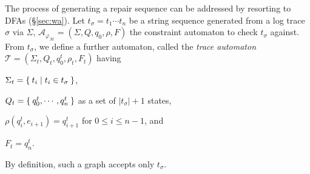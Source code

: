 %

The process of generating a repair sequence can be addressed by resorting to DFAs (\S\ref{sec:wa}). Let $t_\sigma=t_1\cdots t_n$ be a string sequence generated from a log trace $\sigma$ via $\Sigma$, $\mathcal{A}_{\varphi_{\mathcal{M}}}=(\Sigma,Q,q_0,\rho,F)$ the constraint automaton to check $t_\sigma$ against. From $t_\sigma$, we define a further automaton, called the \textit{trace automaton} $\mathcal{T}=(\Sigma_t,Q_t,q_0^t,\rho_t,F_t)$ having \begin{enumerate*}[label=\emph{\alph*})]
	\item $\Sigma_t=\Set{t_i|t_i\in t_\sigma}$,
	\item $Q_t=\Set{q_0^t,\cdots,q_n^t}$ as a set of $|t_\sigma|+1$ states,
	\item $\rho(q_i^t,e_{i+1})=q_{i+1}^t$ for $0\leq i\leq n-1$,
	and
	\item $F_t={q_n^t}$.
\end{enumerate*} By definition, such a graph accepts only $t_\sigma$.

